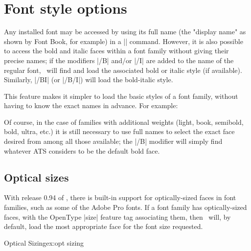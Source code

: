 \section{Font style options}

Any installed font may be accessed by using its full name (the "display name" as shown by Font Book, for example) in a |\font| command. However, it is also possible to access the bold and italic faces within a font family without giving their precise names; if the modifiers |/B| and/or |/I| are added to the name of the regular font, \XeTeX\ will find and load the associated bold or italic style (if available). Similarly, |/BI| (or |/B/I|) will load the bold-italic style.

This feature makes it simpler to load the basic styles of a font family, without having to know the exact names in advance. For example:


\begin{comment}
\begin{tabular}{ll}
\em Name specified&\em Font used\cr
\showfont{"Palatino Linotype/B"}{Palatino Linotype Bold}
\showfont{"Times New Roman/B"}{Times New Roman Bold}
\showfont{"Times New Roman/I"}{Times New Roman Italic}
\showfont{"Linux Libertine O/BI"}{Linux Libertine Black Italic}
\end{tabular}
\end{comment}



Of course, in the case of families with additional weights (light, book, semibold, bold, ultra, etc.) it is still necessary to use full names to select the exact face desired from among all those available; the |/B| modifier will simply find whatever ATS considers to be the default bold face.

\subsection{Optical sizes}

With release 0.94 of \XeTeX, there is built-in support for optically-sized faces in font families, such as some of the Adobe Pro fonts. If a font family has optically-sized faces, with the OpenType |size| feature tag associating them, then \XeTeX\ will, by default, load the most appropriate face for the font size requested. 

\begin{texexample}{Optical Sizing}{ex:opt sizing}
\bgroup
\egroup
\end{texexample}

